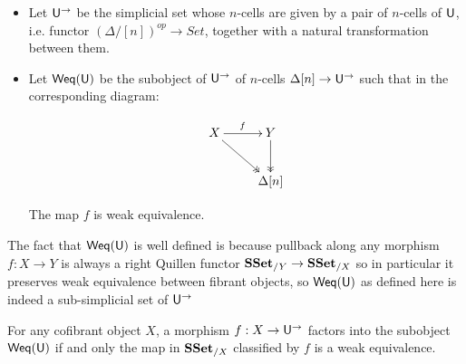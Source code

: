 \documentclass[reqno,10pt,a4paper,oneside,draft]{amsart}
\begin{document}
\begin{definition}
\leavevmode
\begin{itemize}

\item Let $\mathsf{U}^{\rightarrow}$ be the simplicial set whose $n$-cells are given by a pair of $n$-cells of $\mathsf{U}$, i.e. functor $(\Delta/[n])^{op} \rightarrow Set$, together with a natural transformation between them.


\item Let $\mathsf{Weq}(\mathsf{U})$ be the subobject of $\mathsf{U}^{\rightarrow}$ of $n$-cells $\Delta[n] \rightarrow \mathsf{U}^{\rightarrow}$ such that in the corresponding diagram:
 

\[\xymatrix{ X \ar[r]^{f} \ar@{->>}[dr] & Y \ar@{->>}[d] \\
& \Delta[n]
}\]

The map $f$ is weak equivalence.

\end{itemize}

\end{definition}


The fact that $\mathsf{Weq}(\mathsf{U})$ is well defined is because pullback along any morphism $f:X \rightarrow Y$ is always a right Quillen functor $\mathbf{SSet}_{/Y} \rightarrow \mathbf{SSet}_{/X}$ so in particular it preserves weak equivalence between fibrant objects, so $\mathsf{Weq}(\mathsf{U})$ as defined here is indeed a sub-simplicial set of $\mathsf{U}^{\rightarrow}$

\begin{proposition}
\label{prop:Weq_classify_Weq}
For any cofibrant object $X$, a morphism $f:X \rightarrow \mathsf{U}^{\rightarrow}$ factors into the subobject $\mathsf{Weq}(\mathsf{U})$ if and only the map in $\mathbf{SSet}_{/X}$ classified by $f$ is a weak equivalence.

\end{proposition}
\end{document}
